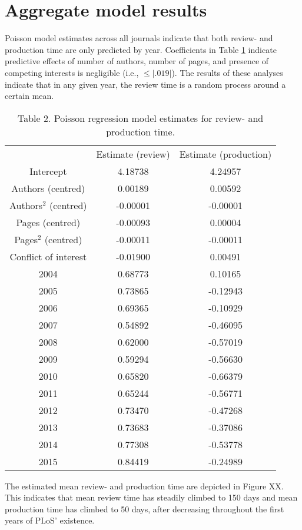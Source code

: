 \section*{Aggregate model results}
Poisson model estimates across all journals indicate that both review- and production time are only predicted by year. Coefficients in Table \ref{tab:tab2} indicate predictive effects of number of authors, number of pages, and presence of competing interests is negligible (i.e., $\leq |.019|$). The results of these analyses indicate that in any given year, the review time is a random process around a certain mean.

\begin{table}
\caption{Table 2. Poisson regression model estimates for review- and production time.}
\label{tab:tab2}
\begin{tabular}{ c c c }
    & Estimate (review) & Estimate (production) \\
    Intercept & 4.18738 & 4.24957 \\
    Authors (centred) & 0.00189 & 0.00592 \\
    Authors$^2$ (centred) & -0.00001 & -0.00001 \\
    Pages (centred) & -0.00093 & 0.00004 \\
    Pages$^2$ (centred) & -0.00011 & -0.00011 \\
    Conflict of interest & -0.01900 & 0.00491 \\
    2004  & 0.68773 & 0.10165 \\
    2005  & 0.73865 & -0.12943 \\
    2006  & 0.69365 & -0.10929 \\
    2007  & 0.54892 & -0.46095 \\
    2008  & 0.62000 & -0.57019 \\
    2009  & 0.59294 & -0.56630 \\
    2010  & 0.65820 & -0.66379 \\
    2011  & 0.65244 & -0.56771 \\
    2012  & 0.73470 & -0.47268 \\
    2013  & 0.73683 & -0.37086 \\
    2014  & 0.77308 & -0.53778 \\
    2015  & 0.84419 & -0.24989 \\
\end{tabular}
\end{table}

The estimated mean review- and production time are depicted in Figure XX. This indicates that mean review time has steadily climbed to 150 days and mean production time has climbed to 50 days, after decreasing throughout the first years of PLoS' existence.